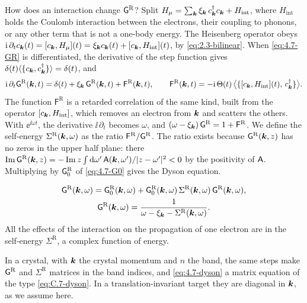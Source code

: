 How does an interaction change $\mathsf{G}^{\mathrm{R}}$? Split $H_\mu = \sum_{\bm{k}}\xi_{\bm{k}}\,c^\dagger_{\bm{k}}c_{\bm{k}} + H_{\mathrm{int}}$, where $H_{\mathrm{int}}$ holds the Coulomb interaction between the electrons, their coupling to phonons, or any other term that is not a one-body energy. The Heisenberg operator obeys $\mathrm{i}\,\partial_tc_{\bm{k}}(t) = [c_{\bm{k}}, H_\mu](t) = \xi_{\bm{k}}c_{\bm{k}}(t) + [c_{\bm{k}}, H_{\mathrm{int}}](t)$, by \cref{eq:2.3-bilinear}. When \cref{eq:4.7-GR} is differentiated, the derivative of the step function gives $\delta(t)\langle\{c_{\bm{k}}, c^\dagger_{\bm{k}}\}\rangle = \delta(t)$, and
\begin{equation*}
  \mathrm{i}\,\partial_t\mathsf{G}^{\mathrm{R}}(\bm{k},t) = \delta(t) + \xi_{\bm{k}}\,\mathsf{G}^{\mathrm{R}}(\bm{k},t) + \mathsf{F}^{\mathrm{R}}(\bm{k},t), \qquad
  \mathsf{F}^{\mathrm{R}}(\bm{k},t) = -\mathrm{i}\,\Theta(t)\,\bigl\langle\{[c_{\bm{k}}, H_{\mathrm{int}}](t),\,c^\dagger_{\bm{k}}\}\bigr\rangle .
\end{equation*}
The function $\mathsf{F}^{\mathrm{R}}$ is a retarded correlation of the same kind, built from the operator $[c_{\bm{k}}, H_{\mathrm{int}}]$, which removes an electron from $\bm{k}$ and scatters the others. With $\ee^{\ii\omega t}$, the derivative $\ii\,\partial_t$ becomes $\omega$, and $(\omega - \xi_{\bm{k}})\,\mathsf{G}^{\mathrm{R}} = 1 + \mathsf{F}^{\mathrm{R}}$. We define the self-energy $\Sigma^{\mathrm{R}}(\bm{k},\omega)$ as the ratio $\mathsf{F}^{\mathrm{R}}/\mathsf{G}^{\mathrm{R}}$. The ratio exists because $\mathsf{G}^{\mathrm{R}}(\bm{k},z)$ has no zeros in the upper half plane: there $\operatorname{Im}\mathsf{G}^{\mathrm{R}}(\bm{k},z) = -\operatorname{Im} z\int\mathrm{d}\omega'\,\mathsf{A}(\bm{k},\omega')/|z - \omega'|^2 < 0$ by the positivity of $\mathsf{A}$. Multiplying by $\mathsf{G}^{\mathrm{R}}_0$ of \cref{eq:4.7-G0} gives the Dyson equation.
\begin{keyresult}
\begin{equation}
  \begin{gathered}
  \mathsf{G}^{\mathrm{R}}(\bm{k},\omega) = \mathsf{G}^{\mathrm{R}}_0(\bm{k},\omega) + \mathsf{G}^{\mathrm{R}}_0(\bm{k},\omega)\,\Sigma^{\mathrm{R}}(\bm{k},\omega)\,\mathsf{G}^{\mathrm{R}}(\bm{k},\omega), \\
  \mathsf{G}^{\mathrm{R}}(\bm{k},\omega) = \frac{1}{\omega - \xi_{\bm{k}} - \Sigma^{\mathrm{R}}(\bm{k},\omega)} .
  \end{gathered}
  \label{eq:4.7-dyson}
\end{equation}
All the effects of the interaction on the propagation of one electron are in the self-energy $\Sigma^{\mathrm{R}}$, a complex function of energy.
\end{keyresult}
In a crystal, with $\bm{k}$ the crystal momentum and $n$ the band, the same steps make $\mathsf{G}^{\mathrm{R}}$ and $\Sigma^{\mathrm{R}}$ matrices in the band indices, and \cref{eq:4.7-dyson} a matrix equation of the type \cref{eq:C.7-dyson}. In a translation-invariant target they are diagonal in $\bm{k}$, as we assume here.

